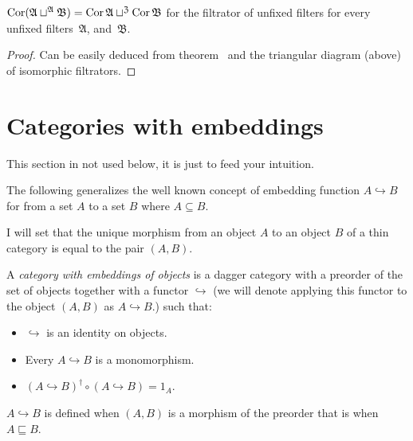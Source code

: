 \begin{prop}
$\operatorname{Cor}(\mathfrak{A}\sqcup^{\mathfrak{A}}\mathfrak{B}) =
\operatorname{Cor}\mathfrak{A}\sqcup^{\mathfrak{Z}}\operatorname{Cor}\mathfrak{B}$ for the filtrator of unfixed filters for every unfixed filters~$\mathfrak{A}$, and~$\mathfrak{B}$.
\end{prop}

\begin{proof}
Can be easily deduced from theorem~
and the triangular diagram (above) of isomorphic filtrators.
\end{proof}


\section{Categories with embeddings}

\begin{note}
This section in not used below, it is just to feed your intuition.
\end{note}

The following generalizes the well known concept of embedding function $A
\hookrightarrow B$ for from a set $A$ to a set $B$ where $A \subseteq B$.

I will set that the unique morphism from an object $A$ to an object $B$ of a
thin category is equal to the pair $(A , B)$.

\begin{defn}
  A \emph{category with embeddings of objects} is a dagger category with a
  preorder of the set of objects together with a functor $\hookrightarrow$ (we
  will denote applying this functor to the object $(A , B)$ as $A
  \hookrightarrow B$.) such that:
  \begin{itemize}
    \item $\hookrightarrow$ is an identity on objects.
    
    \item Every $A \hookrightarrow B$ is a monomorphism.
    
    \item $(A \hookrightarrow B)^{\dagger} \circ (A \hookrightarrow B) = 1_A$.
  \end{itemize}
\end{defn}

\begin{obvious}
$A\hookrightarrow B$ is defined when $(A , B)$ is a morphism of the preorder
that is when $A \sqsubseteq B$.
\end{obvious}

